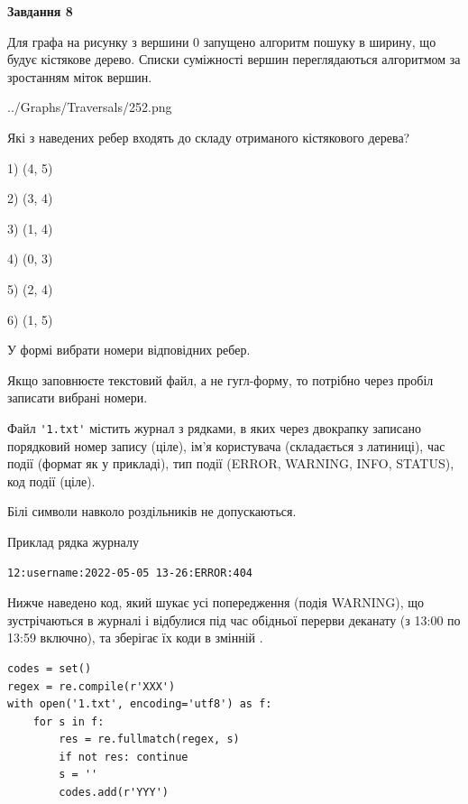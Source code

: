 \documentclass[12pt, ukrainian]{article}
\def\code#1{\Verb!#1!}
\begin{document}
{\begin {large}
{\begin {center}\textbf{Завдання 8}\end {center}}\par
Для графа на рисунку з вершини 0 запущено алгоритм пошуку в ширину, що будує кістякове дерево. Списки суміжності вершин переглядаються алгоритмом за зростанням міток вершин.\par
\begin{center}
	{../Graphs/Traversals/252.png}
\end{center}
\par Які з наведених ребер входять до складу отриманого кістякового дерева?\par
1) (4, 5)\par
2) (3, 4)\par
3) (1, 4)\par
4) (0, 3)\par
5) (2, 4)\par
6) (1, 5)\par
{\vskip 15pt} У формі вибрати номери відповідних ребер.


Якщо заповнюєте текстовий файл, а не гугл-форму, то потрібно через пробіл записа\-ти вибрані номери.\par
\newpage


Файл \code{'1.txt'} містить журнал з рядками, в яких через двокрапку записано поряд\-ко\-вий номер запису (ціле), ім'я користувача (складається з латиниці), час події (фор\-мат як у прикладі), тип події (ERROR, WARNING, INFO, STATUS), код події (ціле).

Білі символи навколо роздільників не допускаються.

Приклад рядка журналу



\begin{verbatim}
12:username:2022-05-05 13-26:ERROR:404
\end{verbatim}


Нижче наведено код, який шукає усі попередження (подія WARNING), що зустрі\-ча\-ються в журналі і відбулися під час обідньої перерви деканату (з 13:00 по 13:59 включно), та зберігає їх коди в змінній .



\begin{verbatim}
codes = set()
regex = re.compile(r'XXX')
with open('1.txt', encoding='utf8') as f:
    for s in f:
        res = re.fullmatch(regex, s)
        if not res: continue
        s = ''
        codes.add(r'YYY')
\end{verbatim}





\end{large}}
\end{document}
